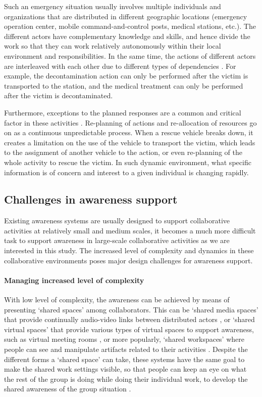 Such an emergency situation usually involves multiple individuals and organizations that are distributed in different geographic locations (emergency operation center, mobile command-and-control posts, medical stations, etc.). The different actors have complementary knowledge and skills, and hence divide the work so that they can work relatively autonomously within their local environment and responsibilities. In the same time, the actions of different actors are interleaved with each other due to different types of dependencies \cite{shen2004managing}. For example, the decontamination action can only be performed after the victim is transported to the station, and the medical treatment can only be performed after the victim is decontaminated.

Furthermore, exceptions to the planned responses are a common and critical factor in these activities \cite{Turoff2004}. Re-planning of actions and re-allocation of resources go on as a continuous unpredictable process. When a rescue vehicle breaks down, it creates a limitation on the use of the vehicle to transport the victim, which leads to the assignment of another vehicle to the action, or even re-planning of the whole activity to rescue the victim. In such dynamic environment, what specific information is of concern and interest to a given individual is changing rapidly.

\subsection{Challenges in awareness support} %
\label{sub:challenges_in_awareness_support}
Existing awareness systems are usually designed to support collaborative activities at relatively small and medium scales, it becomes a much more difficult task to support awareness in large-scale collaborative activities as we are interested in this study. The increased level of complexity and dynamics in these collaborative environments poses major design challenges for awareness support. 

\paragraph*{Managing increased level of complexity} %
\label{par:managing_increased_level_of_complexity}
With low level of complexity, the awareness can be achieved by means of presenting `shared spaces' among collaborators. This can be `shared media spaces' that provide continually audio-video links between distributed actors \cite{Dourish1992}, or `shared virtual spaces' that provide various types of virtual spaces to support awareness, such as virtual meeting rooms \cite{Berlage1999}, or more popularly, `shared workspaces' where people can see and manipulate artifacts related to their activities \cite{Gutwin2002}. Despite the different forms a `shared space' can take, these systems have the same goal to make the shared work settings visible, so that people can keep an eye on what the rest of the group is doing while doing their individual work, to develop the shared awareness of the group situation \cite{schmidt2002a}.

